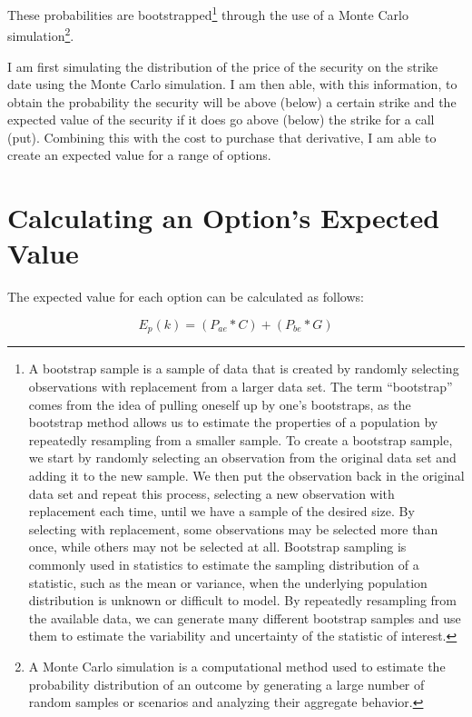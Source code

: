 \documentclass[
]{book}
\begin{document}
These probabilities are bootstrapped\footnote{A bootstrap sample is a sample of data
  that is created by randomly selecting observations with replacement from a
  larger data set. The term ``bootstrap'' comes from the idea of pulling oneself up
  by one's bootstraps, as the bootstrap method allows us to estimate the
  properties of a population by repeatedly resampling from a smaller sample.
  To create a bootstrap sample, we start by randomly selecting an
  observation from the original data set and adding it to the new sample. We then
  put the observation back in the original data set and repeat this process,
  selecting a new observation with replacement each time, until we have a sample
  of the desired size. By selecting with replacement, some observations may be
  selected more than once, while others may not be selected at all.
  Bootstrap sampling is commonly used in statistics to estimate the sampling
  distribution of a statistic, such as the mean or variance, when the underlying
  population distribution is unknown or difficult to model. By repeatedly
  resampling from the available data, we can generate many different bootstrap
  samples and use them to estimate the variability and uncertainty of the
  statistic of interest.} through the use of a Monte Carlo simulation\footnote{A Monte
  Carlo simulation is a computational method used to estimate the probability
  distribution of an outcome by generating a large number of random samples or
  scenarios and analyzing their aggregate behavior.}.

I am first simulating the distribution of the price of the security on the
strike date using the Monte Carlo simulation. I am then able, with this
information, to obtain the probability the security will be above (below) a
certain strike and the expected value of the security if it does go above
(below) the strike for a call (put). Combining this with the cost to purchase
that derivative, I am able to create an expected value for a range of options.

\hypertarget{ev}{%
\chapter{Calculating an Option's Expected Value}\label{ev}}

The expected value for each option can be calculated as follows:

\begin{equation} 
E_p(k) = (P_{ae} * C) + (P_{be} * G)
\label{eq:puts}
\end{equation}
\end{document}
